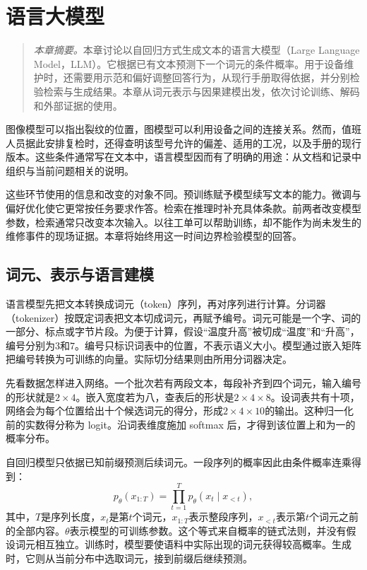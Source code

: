 \chapter{语言大模型}
\begin{quote}\small
\textit{本章摘要。}本章讨论以自回归方式生成文本的语言大模型（Large Language Model，LLM）。它根据已有文本预测下一个词元的条件概率。用于设备维护时，还需要用示范和偏好调整回答行为，从现行手册取得依据，并分别检验检索与生成结果。本章从词元表示与因果建模出发，依次讨论训练、解码和外部证据的使用。
\end{quote}
图像模型可以指出裂纹的位置，图模型可以利用设备之间的连接关系。然而，值班人员据此安排复检时，还得查明该型号允许的偏差、适用的工况，以及手册的现行版本。这些条件通常写在文本中，语言模型因而有了明确的用途：从文档和记录中组织与当前问题相关的说明。

这些环节使用的信息和改变的对象不同。预训练赋予模型续写文本的能力。微调与偏好优化使它更常按任务要求作答。检索在推理时补充具体条款。前两者改变模型参数，检索通常只改变本次输入。以往工单可以帮助训练，却不能作为尚未发生的维修事件的现场证据。本章将始终用这一时间边界检验模型的回答。
\section{词元、表示与语言建模}

语言模型先把文本转换成词元（token）序列，再对序列进行计算。分词器（tokenizer）按既定词表把文本切成词元，再赋予编号。词元可能是一个字、词的一部分、标点或字节片段。为便于计算，假设“温度升高”被切成“温度”和“升高”，编号分别为$3$和$7$。编号只标识词表中的位置，不表示语义大小。模型通过嵌入矩阵把编号转换为可训练的向量。实际切分结果则由所用分词器决定。

先看数据怎样进入网络。一个批次若有两段文本，每段补齐到四个词元，输入编号的形状就是$2\times4$。嵌入宽度若为八，查表后的形状是$2\times4\times8$。设词表共有十项，网络会为每个位置给出十个候选词元的得分，形成$2\times4\times10$的输出。这种归一化前的实数得分称为 logit。沿词表维度施加 softmax 后，才得到该位置上和为一的概率分布。

自回归模型只依据已知前缀预测后续词元。一段序列的概率因此由条件概率连乘得到：
\begin{equation}
 p_\theta(x_{1:T})=\prod_{t=1}^{T}p_\theta(x_t\mid x_{<t}),\label{eq:llm-chain-probability}
\end{equation}
其中，$T$是序列长度，$x_t$是第$t$个词元，$x_{1:T}$表示整段序列，$x_{<t}$表示第$t$个词元之前的全部内容。$\theta$表示模型的可训练参数。这个等式来自概率的链式法则，并没有假设词元相互独立。训练时，模型要使语料中实际出现的词元获得较高概率。生成时，它则从当前分布中选取词元，接到前缀后继续预测。

